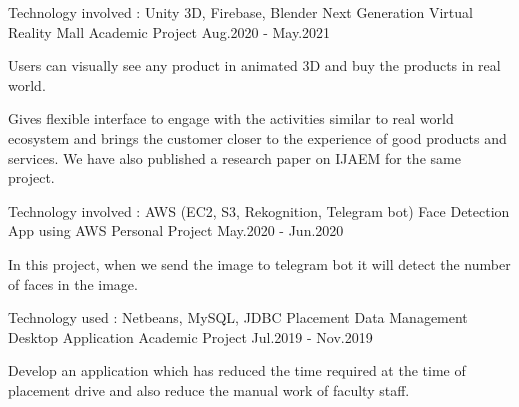 

\begin{cventries}

  \cventry
    {Technology involved : Unity 3D, Firebase, Blender} %
    {Next Generation Virtual Reality Mall} %
    {Academic Project} %
    {Aug.2020 - May.2021} %
    {
      \begin{cvitems} %
        \item {Users can visually see any product in animated 3D and buy the products in real world.}
        \item {Gives flexible interface to engage with the activities similar to real world ecosystem and brings the customer closer to the experience of good products and services. We have also published a research paper on IJAEM for the same project.}
      \end{cvitems}
    }


 \cventry
    {Technology involved : AWS (EC2, S3, Rekognition, Telegram bot)} %
    {Face Detection App using AWS} %
    {Personal Project} %
    {May.2020 - Jun.2020} %
    {
      \begin{cvitems} %
        \item {In this project, when we send the image to telegram bot it will detect the number of faces in the image.}
      \end{cvitems}
    }


 \cventry
    {Technology used : Netbeans, MySQL, JDBC} %
    {Placement Data Management Desktop Application} %
    {Academic Project} %
    {Jul.2019 - Nov.2019} %
    {
      \begin{cvitems} %
        \item {Develop an application which has reduced the time required at the time of placement drive and also reduce the manual work of faculty staff.}
      \end{cvitems}
    }

\end{cventries}
